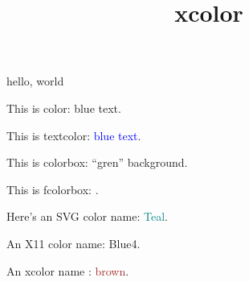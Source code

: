 \documentclass{amsart}
\title{xcolor}
\begin{document}
\maketitle

hello, world



This is color: {\color{blue} blue text}.

This is textcolor: \textcolor{blue}{blue text}.

This is colorbox: \colorbox{gren}{``gren'' background}.

This is fcolorbox: .

Here's an SVG color name: \textcolor{Teal}{Teal}.

An X11 color name: \textcolor{Blue4}{Blue4}.

An xcolor name : \textcolor{brown}{brown}.
\end{document}
